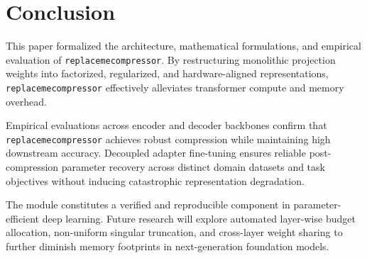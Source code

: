 \section{Conclusion}
This paper formalized the architecture, mathematical formulations, and empirical evaluation of \texttt{replacemecompressor}. By restructuring monolithic projection weights into factorized, regularized, and hardware-aligned representations, \texttt{replacemecompressor} effectively alleviates transformer compute and memory overhead.

Empirical evaluations across encoder and decoder backbones confirm that \texttt{replacemecompressor} achieves robust compression while maintaining high downstream accuracy. Decoupled adapter fine-tuning ensures reliable post-compression parameter recovery across distinct domain datasets and task objectives without inducing catastrophic representation degradation.

The module constitutes a verified and reproducible component in parameter-efficient deep learning. Future research will explore automated layer-wise budget allocation, non-uniform singular truncation, and cross-layer weight sharing to further diminish memory footprints in next-generation foundation models.
